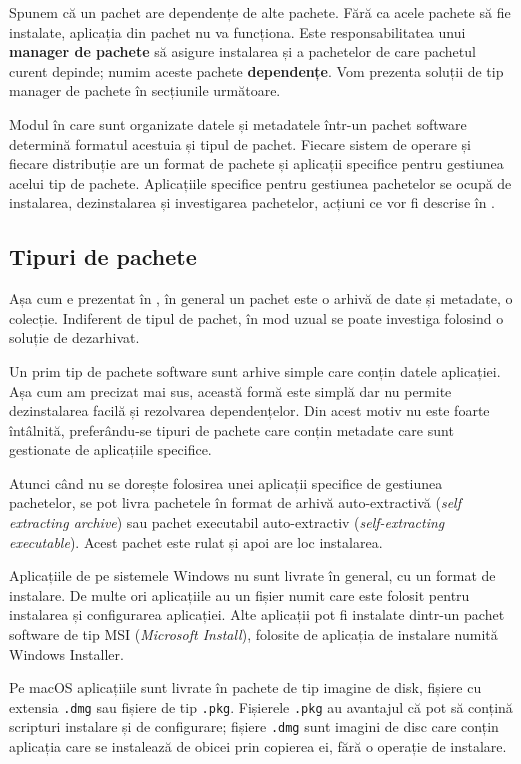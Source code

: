 Spunem că un pachet are dependențe de alte pachete. Fără ca acele pachete să fie instalate, aplicația din pachet nu va funcționa. Este responsabilitatea unui \textbf{manager de pachete} să asigure instalarea și a pachetelor de care pachetul curent depinde; numim aceste pachete \textbf{dependențe}. Vom prezenta soluții de tip manager de pachete în secțiunile următoare.

Modul în care sunt organizate datele și metadatele într-un pachet software determină formatul acestuia și tipul de pachet. Fiecare sistem de operare și fiecare distribuție are un format de pachete și aplicații specifice pentru gestiunea acelui tip de pachete. Aplicațiile specifice pentru gestiunea pachetelor se ocupă de instalarea, dezinstalarea și investigarea pachetelor, acțiuni ce vor fi descrise în .

\subsection{Tipuri de pachete}
\label{sec:package:types}

Așa cum e prezentat în , în general un pachet este o arhivă de date și metadate, o colecție. Indiferent de tipul de pachet, în mod uzual se poate investiga folosind o soluție de dezarhivat.

Un prim tip de pachete software sunt arhive simple care conțin datele aplicației. Așa cum am precizat mai sus, această formă este simplă dar nu permite dezinstalarea facilă și rezolvarea dependențelor. Din acest motiv nu este foarte întâlnită, preferându-se tipuri de pachete care conțin metadate care sunt gestionate de aplicațiile specifice.

Atunci când nu se dorește folosirea unei aplicații specifice de gestiunea pachetelor, se pot livra pachetele în format de arhivă auto-extractivă (\textit{self extracting archive}) sau pachet executabil auto-extractiv (\textit{self-extracting executable}). Acest pachet este rulat și apoi are loc instalarea.

Aplicațiile de pe sistemele Windows nu sunt livrate în general, cu un format de instalare. De multe ori aplicațiile au un fișier numit  care este folosit pentru instalarea și configurarea aplicației. Alte aplicații pot fi instalate dintr-un pachet software de tip MSI (\textit{Microsoft Install}), folosite de aplicația de instalare numită Windows Installer.

Pe macOS aplicațiile sunt livrate în pachete de tip imagine de disk, fișiere cu extensia \texttt{.dmg} sau fișiere de tip \texttt{.pkg}. Fișierele \texttt{.pkg} au avantajul că pot să conțină scripturi instalare și de configurare; fișiere \texttt{.dmg} sunt imagini de disc care conțin aplicația care se instalează de obicei prin copierea ei, fără o operație de instalare.

